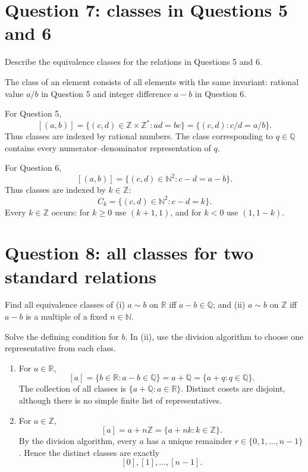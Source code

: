\documentclass[11pt,openany]{book}
\newcommand{\N}{\mathbb N}\newcommand{\Z}{\mathbb Z}
\newcommand{\Q}{\mathbb Q}\newcommand{\R}{\mathbb R}
\begin{document}
\section{Question 7: classes in Questions 5 and 6}
\begin{questionbox}
Describe the equivalence classes for the relations in Questions 5 and 6.
\end{questionbox}
\begin{approachbox}
The class of an element consists of all elements with the same invariant: rational value $a/b$ in Question 5 and integer difference $a-b$ in Question 6.
\end{approachbox}
\begin{solutionbox}
For Question 5,
\[
[(a,b)]=\{(c,d)\in\Z\times\Z^*:ad=bc\}
=\{(c,d):c/d=a/b\}.
\]
Thus classes are indexed by rational numbers. The class corresponding to $q\in\Q$ contains every numerator--denominator representation of $q$.

For Question 6,
\[
[(a,b)]=\{(c,d)\in\N^2:c-d=a-b\}.
\]
Thus classes are indexed by $k\in\Z$:
\[
C_k=\{(c,d)\in\N^2:c-d=k\}.
\]
Every $k\in\Z$ occurs: for $k\ge0$ use $(k+1,1)$, and for $k<0$ use $(1,1-k)$.
\end{solutionbox}

\section{Question 8: all classes for two standard relations}
\begin{questionbox}
Find all equivalence classes of (i) $a\sim b$ on $\R$ iff $a-b\in\Q$; and (ii) $a\sim b$ on $\Z$ iff $a-b$ is a multiple of a fixed $n\in\N$.
\end{questionbox}
\begin{approachbox}
Solve the defining condition for $b$. In (ii), use the division algorithm to choose one representative from each class.
\end{approachbox}
\begin{solutionbox}
\begin{enumerate}[label=(\roman*)]
\item For $a\in\R$,
\[
[a]=\{b\in\R:a-b\in\Q\}=a+\Q=\{a+q:q\in\Q\}.
\]
The collection of all classes is $\{a+\Q:a\in\R\}$. Distinct cosets are disjoint, although there is no simple finite list of representatives.

\item For $a\in\Z$,
\[
[a]=a+n\Z=\{a+nk:k\in\Z\}.
\]
By the division algorithm, every $a$ has a unique remainder $r\in\{0,1,\ldots,n-1\}$. Hence the distinct classes are exactly
\[
[0],[1],\ldots,[n-1].
\]
\end{enumerate}
\end{solutionbox}
\end{document}
